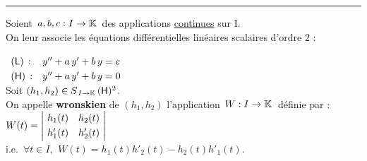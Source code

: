 \vspace{1cm}

\hrule

\vspace{1.5cm}

Soient \(\,a,b,c:I\to\mathbb{K}\,\) des applications \underline{continues} sur I.\vspace{-0.45cm}\\
On leur associe les équations différentielles linéaires scalaires d'ordre 2 : \(
\begin{array}{ll}
    & \\
    (\mathsf{L})\,: & y'' +a\,y' +b\,y=c\vspace{0.1cm} \\
    (\mathsf{H})\,: & y'' +a\,y' +b\,y=0
\end{array}\)\vspace{0.5cm}\\
Soit \((h_1,h_2)\in S_{\,I\to \mathbb{K}}\,(\mathsf{H})^2\).\vspace{-0.1cm}\\
On appelle \textbf{wronskien} de $(h_1,h_2)$ l'application \(\,W:I\to \mathbb{K}\,\) définie par : \(W(t)=\left|\!
\begin{array}{cc}
    h_1(t) & h_2(t)\vspace{0.1cm}\\
    h'_1(t) & h'_2(t)
\end{array}\!\right|\)\\
i.e. \(\, \forall t\in I,\ \, W(t) = h_1(t)h'_2(t)-h_2(t)h'_1(t).\)

\newpage

\printindex